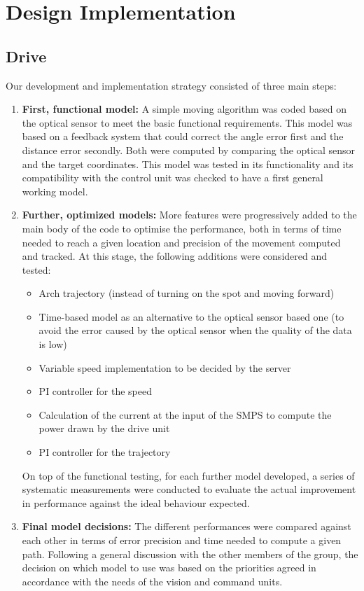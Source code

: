 \documentclass[10pt,twoside]{article}
\begin{document}
\newpage

\section{Design Implementation}

\subsection{Drive}

 Our development and implementation strategy consisted of three main steps:
 \begin{enumerate}
     \item \textbf{First, functional model:} A simple moving algorithm was coded based on the optical sensor to meet the basic functional requirements. This model was based on a feedback system that could correct the angle error first and the distance error secondly. Both were computed by comparing the optical sensor and the target coordinates. This model was tested in its functionality and its compatibility with the control unit was checked to have a first general working model. 
    \item \textbf{Further, optimized models:} More features were progressively added to the main body of the code to optimise the performance, both in terms of time needed to reach a given location and precision of the movement computed and tracked. At this stage, the following additions were considered and tested:
	     \begin{itemize}
            \item Arch trajectory (instead of turning on the spot and moving forward)
	        \item Time-based model as an alternative to the optical sensor based one (to avoid the error caused by the optical sensor when the quality of the data is low)
            \item Variable speed implementation to be decided by the server
            \item PI controller for the speed
            \item Calculation of the current at the input of the SMPS to compute the power drawn by the drive unit
            \item PI controller for the trajectory
        \end{itemize}
    On top of the functional testing, for each further model developed, a series of systematic measurements were conducted to evaluate the actual improvement in performance against the ideal behaviour expected.
    \item \textbf{Final model decisions:} The different performances were compared against each other in terms of error precision and time needed to compute a given path. Following a general discussion with the other members of the group, the decision on which model to use was based on the priorities agreed in accordance with the needs of the vision and command units. 
 \end{enumerate}
\end{document}
